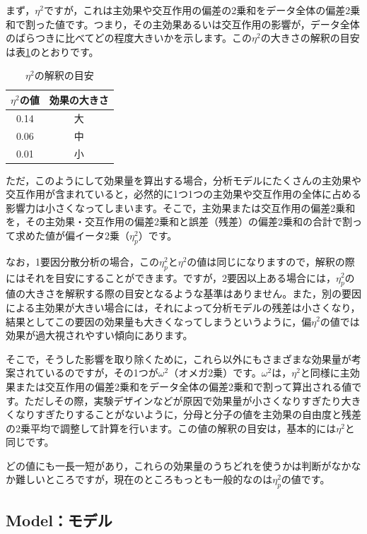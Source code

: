 \documentclass[
  12pt,
  a5jpaper,
  lualatex, ja=standard]{bxjsbook}
\begin{document}
まず，\(\eta^2\)ですが，これは主効果や交互作用の偏差の2乗和をデータ全体の偏差2乗和で割った値です。つまり，その主効果あるいは交互作用の影響が，データ全体のばらつきに比べてどの程度大きいかを示します。この\(\eta^2\)の大きさの解釈の目安は表\ref{tab:ANOVA-anova-eta-interpretation}のとおりです。

\begin{table}[H]

\caption{\label{tab:ANOVA-anova-eta-interpretation}$\eta^2$の解釈の目安}
\centering
\begin{tabular}[t]{cc}
\toprule
$\eta^2$の値 & 効果の大きさ\\
\midrule
0.14 & 大\\
0.06 & 中\\
0.01 & 小\\
\bottomrule
\end{tabular}
\end{table}

ただ，このようにして効果量を算出する場合，分析モデルにたくさんの主効果や交互作用が含まれていると，必然的に1つ1つの主効果や交互作用の全体に占める影響力は小さくなってしまいます。そこで，主効果または交互作用の偏差2乗和を，その主効果・交互作用の偏差2乗和と誤差（残差）の偏差2乗和の合計で割って求めた値が偏イータ2乗（\(\eta^2_p\)）です。

なお，1要因分散分析の場合，この\(\eta^2_p\)と\(\eta^2\)の値は同じになりますので，解釈の際にはそれを目安にすることができます。ですが，2要因以上ある場合には，\(\eta^2_p\)の値の大きさを解釈する際の目安となるような基準はありません。また，別の要因による主効果が大きい場合には，それによって分析モデルの残差は小さくなり，結果としてこの要因の効果量も大きくなってしまうというように，偏\(\eta^2\)の値では効果が過大視されやすい傾向にあります。

そこで，そうした影響を取り除くために，これら以外にもさまざまな効果量が考案されているのですが，その1つが\(\omega^2\)（オメガ2乗）です。\(\omega^2\)は，\(\eta^2\)と同様に主効果または交互作用の偏差2乗和をデータ全体の偏差2乗和で割って算出される値です。ただしその際，実験デザインなどが原因で効果量が小さくなりすぎたり大きくなりすぎたりすることがないように，分母と分子の値を主効果の自由度と残差の2乗平均で調整して計算を行います。この値の解釈の目安は，基本的には\(\eta^2\)と同じです。

どの値にも一長一短があり，これらの効果量のうちどれを使うかは判断がなかなか難しいところですが，現在のところもっとも一般的なのは\(\eta^2_p\)の値です。

\hypertarget{sub:ANOVA-anova-model}{%
\subsection{Model：モデル}\label{sub:ANOVA-anova-model}}
\end{document}
